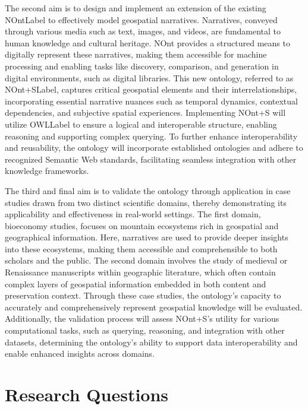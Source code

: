 The second aim is to design and implement an extension of the existing \acrfull{NOntLabel}\cite{meghiniRepresentingNarrativesDigital2021} to effectively model geospatial narratives. Narratives, conveyed through various media such as text, images, and videos, are fundamental to human knowledge and cultural heritage. NOnt provides a structured means to digitally represent these narratives, making them accessible for machine processing and enabling tasks like discovery, comparison, and generation in digital environments, such as digital libraries. This new ontology, referred to as \acrfull{NOnt+SLabel}, captures critical geospatial elements and their interrelationships, incorporating essential narrative nuances such as temporal dynamics, contextual dependencies, and subjective spatial experiences. Implementing NOnt+S will utilize \acrfull{OWLLabel}\cite{OWLWebOntologya,OWLWebOntologyb,OWLWebOntologyc} to ensure a logical and interoperable structure, enabling reasoning and supporting complex querying. To further enhance interoperability and reusability, the ontology will incorporate established ontologies and adhere to recognized Semantic Web standards, facilitating seamless integration with other knowledge frameworks.

The third and final aim is to validate the ontology through application in case studies drawn from two distinct scientific domains, thereby demonstrating its applicability and effectiveness in real-world settings. The first domain, bioeconomy studies, focuses on mountain ecosystems rich in geospatial and geographical information. Here, narratives are used to provide deeper insights into these ecosystems, making them accessible and comprehensible to both scholars and the public. The second domain involves the study of medieval or Renaissance manuscripts within geographic literature, which often contain complex layers of geospatial information embedded in both content and preservation context. Through these case studies, the ontology’s capacity to accurately and comprehensively represent geospatial knowledge will be evaluated. Additionally, the validation process will assess NOnt+S’s utility for various computational tasks, such as querying, reasoning, and integration with other datasets, determining the ontology's ability to support data interoperability and enable enhanced insights across domains.

\section{Research Questions}\label{I-sec:researchQuestions}

